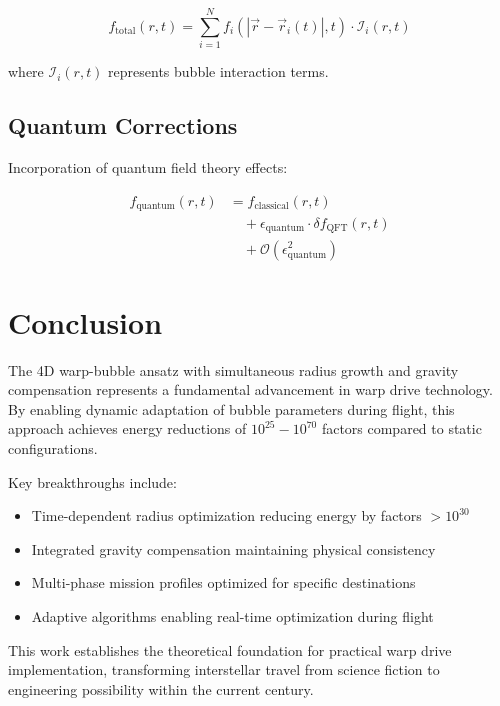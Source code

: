 \documentclass[12pt,a4paper]{article}
\begin{document}
\begin{equation}
f_{\text{total}}(r,t) = \sum_{i=1}^{N} f_i(|\vec{r} - \vec{r}_i(t)|, t) \cdot \mathcal{I}_i(r,t)
\end{equation}

where $\mathcal{I}_i(r,t)$ represents bubble interaction terms.

\subsection{Quantum Corrections}

Incorporation of quantum field theory effects:

\begin{align}
f_{\text{quantum}}(r,t) &= f_{\text{classical}}(r,t) \\
&\quad + \epsilon_{\text{quantum}} \cdot \delta f_{\text{QFT}}(r,t) \\
&\quad + \mathcal{O}(\epsilon_{\text{quantum}}^2)
\end{align}

\section{Conclusion}

The 4D warp-bubble ansatz with simultaneous radius growth and gravity compensation represents a fundamental advancement in warp drive technology. By enabling dynamic adaptation of bubble parameters during flight, this approach achieves energy reductions of $10^{25}-10^{70}$ factors compared to static configurations.

Key breakthroughs include:

\begin{itemize}
\item Time-dependent radius optimization reducing energy by factors $>10^{30}$
\item Integrated gravity compensation maintaining physical consistency
\item Multi-phase mission profiles optimized for specific destinations
\item Adaptive algorithms enabling real-time optimization during flight
\end{itemize}

This work establishes the theoretical foundation for practical warp drive implementation, transforming interstellar travel from science fiction to engineering possibility within the current century.
\end{document}
